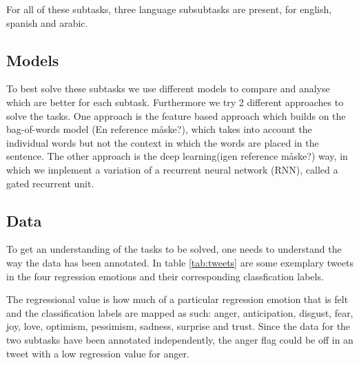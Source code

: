 For all of these subtasks, three language subsubtasks are present, for english, spanish and arabic.\\ 
\subsection{Models}
To best solve these subtasks we use different models to compare and analyse which are better for each subtask. Furthermore we try 2 different approaches to solve the tasks. One approach is the feature based approach which builds on the bag-of-words model (En reference måske?), which takes into account the individual words but not the context in which the words are placed in the sentence. The other approach is the deep learning(igen reference måske?) way, in which we implement a variation of a recurrent neural network (RNN), called a gated recurrent unit.

\subsection{Data}
To get an understanding of the tasks to be solved, one needs to understand the way the data has been annotated. In table \ref{tab:tweets} are some exemplary tweets in the four regression emotions and their corresponding classfication labels.\\
\begin{table}[h]
\caption{Exemplary tweets with regression and clasification labels}
\label{tab:tweets}
\end{table}
The regressional value is how much of a particular regression emotion that is felt and the classification labels are mapped as such: anger, anticipation, disgust, fear, joy, love, optimism, pessimism, sadness, surprise and trust. Since the data for the two subtasks have been annotated independently, the anger flag could be off in an tweet with a low regression value for anger. 